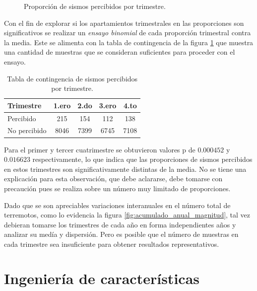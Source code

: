 \documentclass[a4paper]{report}
\begin{document}
\begin{figure}[!ht]
	\centering
	
	\vspace{-0.8cm}
	\caption{Proporción de sismos percibidos por trimestre.}
	\label{fig:percibidos_trimestre_histrograma}
\end{figure}

Con el fin de explorar si los apartamientos trimestrales en las proporciones son significativos se realizar un \emph{ensayo binomial} de cada proporción trimestral contra la media.
Este se alimenta con la tabla de contingencia de la figura \ref{fig:tabla_contingencia_trimestre} que muestra una cantidad de muestras que se consideran suficientes para proceder con el ensayo.

\begin{table}[!ht]
	\centering
	\begin{tabular}{lcccc}
		\toprule
		Trimestre & 1.ero & 2.do & 3.ero & 4.to \\
		\midrule
		Percibido & 215 & 154 & 112 & 138 \\
		No percibido & 8046 & 7399 & 6745 & 7108 \\
		\bottomrule
	\end{tabular}
	\caption{Tabla de contingencia de sismos percibidos por trimestre.}
	\label{fig:tabla_contingencia_trimestre}
\end{table}

Para el primer y tercer cuatrimestre se obtuvieron valores p de \(0.000452\) y \(0.016623\) respectivamente, lo que indica que las proporciones de sismos percibidos en estos trimestres son significativamente distintas de la media.
No se tiene una explicación para esta observación, que debe aclararse, debe tomarse con precaución pues se realiza sobre un número muy limitado de proporciones.

Dado que se son apreciables variaciones interanuales en el número total de terremotos, como lo evidencia la figura \ref{fig:acumulado_anual_magnitud}, tal vez debieran tomarse los trimestres de cada año en forma independientes años y analizar su medía y dispersión.
Pero es posible que el número de muestras en cada trimestre sea insuficiente para obtener resultados representativos. 



\section{Ingeniería de características}\label{sec:ingeniería}
\end{document}
